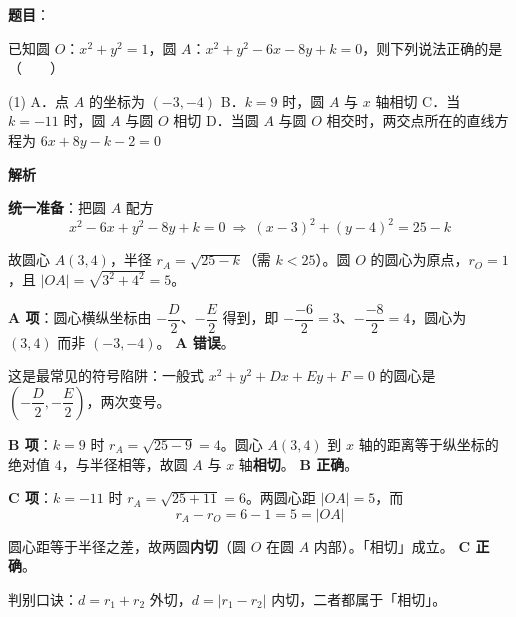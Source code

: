\begin{answer}

\textbf{题目}：

已知圆 $O$：$x^2+y^2=1$，圆 $A$：$x^2+y^2-6x-8y+k=0$，则下列说法正确的是\mbox{（　　）}

\begin{gkopts}(1)
\task A．点 $A$ 的坐标为 $(-3,-4)$
\task B．$k=9$ 时，圆 $A$ 与 $x$ 轴相切
\task C．当 $k=-11$ 时，圆 $A$ 与圆 $O$ 相切
\task D．当圆 $A$ 与圆 $O$ 相交时，两交点所在的直线方程为 $6x+8y-k-2=0$
\end{gkopts}

\textbf{解析}

\textbf{统一准备}：把圆 $A$ 配方
\nopagebreak[4]
\[x^2-6x+y^2-8y+k=0\ \Longrightarrow\ (x-3)^2+(y-4)^2=25-k\]

故圆心 $A(3,4)$，半径 $r_A=\sqrt{25-k}$（需 $k<25$）。圆 $O$ 的圆心为原点，$r_O=1$，且 $\left|OA\right|=\sqrt{3^2+4^2}=5$。

\par\medskip

\textbf{A 项}：圆心横纵坐标由 $-\dfrac{D}{2}$、$-\dfrac{E}{2}$ 得到，即 $-\dfrac{-6}{2}=3$、$-\dfrac{-8}{2}=4$，圆心为 $(3,4)$ 而非 $(-3,-4)$。 \textbf{A 错误}。

\begin{gktip}
这是最常见的符号陷阱：一般式 $x^2+y^2+Dx+Ey+F=0$ 的圆心是 $\left(-\dfrac{D}{2},-\dfrac{E}{2}\right)$，两次变号。
\end{gktip}

\par\medskip

\textbf{B 项}：$k=9$ 时 $r_A=\sqrt{25-9}=4$。圆心 $A(3,4)$ 到 $x$ 轴的距离等于纵坐标的绝对值 $4$，与半径相等，故圆 $A$ 与 $x$ 轴\textbf{相切}。 \textbf{B 正确}。

\par\medskip

\textbf{C 项}：$k=-11$ 时 $r_A=\sqrt{25+11}=6$。两圆心距 $\left|OA\right|=5$，而
\nopagebreak[4]
\[r_A-r_O=6-1=5=\left|OA\right|\]

圆心距等于半径之差，故两圆\textbf{内切}（圆 $O$ 在圆 $A$ 内部）。「相切」成立。 \textbf{C 正确}。

\begin{gktip}
判别口诀：$d=r_1+r_2$ 外切，$d=\left|r_1-r_2\right|$ 内切，二者都属于「相切」。
\end{gktip}

\par\medskip


\end{answer}
